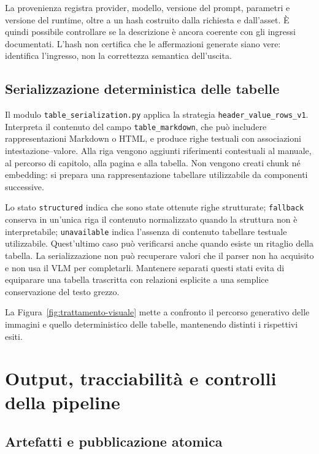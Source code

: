 La provenienza registra provider, modello, versione del prompt, parametri e versione del runtime, oltre a un hash costruito dalla richiesta e dall'asset. È quindi possibile controllare se la descrizione è ancora coerente con gli ingressi documentati. L'hash non certifica che le affermazioni generate siano vere: identifica l'ingresso, non la correttezza semantica dell'uscita.

\subsection{Serializzazione deterministica delle tabelle}

Il modulo \texttt{table\_serialization.py} applica la strategia \texttt{header\_value\_rows\_v1}. Interpreta il contenuto del campo \texttt{table\_markdown}, che può includere rappresentazioni Markdown o HTML, e produce righe testuali con associazioni intestazione--valore. Alla riga vengono aggiunti riferimenti contestuali al manuale, al percorso di capitolo, alla pagina e alla tabella. Non vengono creati chunk né embedding: si prepara una rappresentazione tabellare utilizzabile da componenti successive.

Lo stato \texttt{structured} indica che sono state ottenute righe strutturate; \texttt{fallback} conserva in un'unica riga il contenuto normalizzato quando la struttura non è interpretabile; \texttt{unavailable} indica l'assenza di contenuto tabellare testuale utilizzabile. Quest'ultimo caso può verificarsi anche quando esiste un ritaglio della tabella. La serializzazione non può recuperare valori che il parser non ha acquisito e non usa il VLM per completarli. Mantenere separati questi stati evita di equiparare una tabella trascritta con relazioni esplicite a una semplice conservazione del testo grezzo.

La Figura~\ref{fig:trattamento-visuale} mette a confronto il percorso generativo delle immagini e quello deterministico delle tabelle, mantenendo distinti i rispettivi esiti.



\section{Output, tracciabilità e controlli della pipeline}
\label{sec:output-controlli}

\subsection{Artefatti e pubblicazione atomica}

